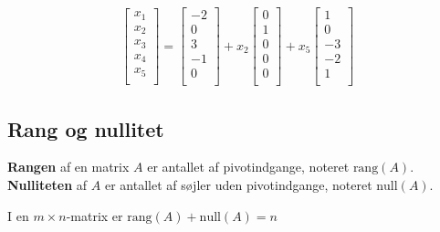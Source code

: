 \begin{eks}
\begin{align*}
\begin{bmatrix}
           x_{1} \\
           x_{2} \\
           x_{3} \\
           x_{4} \\
           x_{5} \\
         \end{bmatrix} 
         = \begin{bmatrix}
           -2 \\
           0 \\
           3 \\
           -1 \\
           0 \\
         \end{bmatrix}
         +x_2 \begin{bmatrix}
           0 \\
           1 \\
           0 \\
           0 \\
           0 \\
         \end{bmatrix}
         +x_5 \begin{bmatrix}
           1 \\
           0 \\
           -3 \\
           -2 \\
           1 \\
         \end{bmatrix}
  \end{align*} 
\label{eks_gauss}
\end{eks}
%
\subsection{Rang og nullitet}
\begin{defn}{}{}
\textbf{Rangen} af en matrix $A$ er antallet af pivotindgange, noteret $\text{rang}(A)$. \\
\textbf{Nulliteten} af $A$ er antallet af søjler uden pivotindgange, noteret $\text{null}(A)$.
\end{defn}
%
I en $m \times n$-matrix er $\text{rang}(A)+\text{null}(A)=n$

